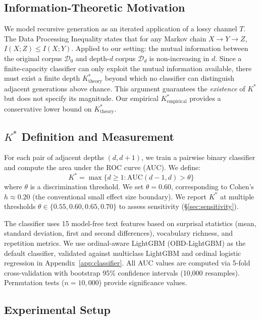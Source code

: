 \documentclass[11pt]{article}
\begin{document}
\subsection{Information-Theoretic Motivation}

We model recursive generation as an iterated application of a lossy channel $T$. The Data Processing Inequality states that for any Markov chain $X \to Y \to Z$, $I(X;Z) \leq I(X;Y)$. Applied to our setting: the mutual information between the original corpus $\mathcal{D}_0$ and depth-$d$ corpus $\mathcal{D}_d$ is non-increasing in $d$. Since a finite-capacity classifier can only exploit the mutual information available, there must exist a finite depth $K^*_{\text{theory}}$ beyond which no classifier can distinguish adjacent generations above chance. This argument guarantees the \emph{existence} of $K^*$ but does not specify its magnitude. Our empirical $K^*_{\text{empirical}}$ provides a conservative lower bound on $K^*_{\text{theory}}$.

\subsection{$K^*$ Definition and Measurement}
\label{sec:kstar_def}

For each pair of adjacent depths $(d, d{+}1)$, we train a pairwise binary classifier and compute the area under the ROC curve (AUC). We define:
\begin{equation}
K^* = \max\{d \geq 1 : \text{AUC}(d{-}1, d) > \theta\}
\end{equation}
where $\theta$ is a discrimination threshold. We set $\theta = 0.60$, corresponding to Cohen's $h \approx 0.20$ (the conventional small effect size boundary). We report $K^*$ at multiple thresholds $\theta \in \{0.55, 0.60, 0.65, 0.70\}$ to assess sensitivity (\S\ref{sec:sensitivity}).

The classifier uses 15 model-free text features based on surprisal statistics (mean, standard deviation, first and second differences), vocabulary richness, and repetition metrics. We use ordinal-aware LightGBM (OBD-LightGBM) as the default classifier, validated against multiclass LightGBM and ordinal logistic regression in Appendix~\ref{app:classifier}. All AUC values are computed via 5-fold cross-validation with bootstrap 95\% confidence intervals (10,000 resamples). Permutation tests ($n=10{,}000$) provide significance values.

\subsection{Experimental Setup}
\end{document}
